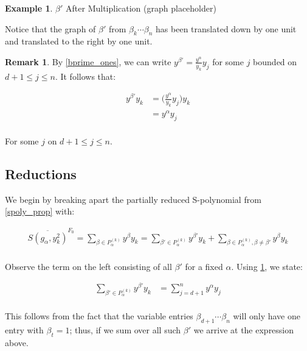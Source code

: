 \documentclass[12pt,reqno]{amsart}
\theoremstyle{plain}
\theoremstyle{definition}
\newtheorem{example}[theorem]{Example}
\newtheorem{remark}[theorem]{Remark}
\begin{document}
\begin{example} \label{bprime_after}
    $\beta'$ After Multiplication (graph placeholder)
\end{example}
Notice that the graph of $\beta'$ from $\beta_k \cdots \beta_{n}$ has been translated down by one unit and translated to the right by one unit. 


\begin{remark} \label{bprime_equiv}
    By \ref{bprime_ones}, we can write $y^{\beta'} = \frac{y^\alpha}{y_k}y_j$ for some $j$ bounded on $d+1 \leq j \leq n$. It follows that:
    
    \begin{align*}
        y^{\beta'}y_k &= \Big(\frac{y^\alpha}{y_k}y_j\Big)y_k \\ 
        &= y^\alpha y_j \\
    \end{align*}
    
For some $j$ on $d+1 \leq j \leq n$.
\end{remark}








\subsection*{Reductions}

We begin by breaking apart the partially reduced S-polynomial from \ref{spoly_prop} with:

\begin{align*}
    \overline{S(g_\alpha, y_k^2)}^{F_0} = \sum_{\beta \in P_\alpha^{(k)}}y^\beta y_k  = \sum_{\beta ' \in P_\alpha^{(k)}} y^{\beta'} y_k + \sum_{\beta \in P_\alpha^{(k)}, \beta \ne \beta '} y^\beta y_k \\
\end{align*}

Observe the term on the left consisting of all $\beta'$ for a fixed $\alpha$. Using \ref{bprime_equiv}, we state:

\begin{align*}
    \sum_{\beta ' \in P_\alpha^{(k)}} y^{\beta'} y_k &= \sum_{j=d+1}^n y^\alpha y_j \\
\end{align*}

This follows from the fact that the variable entries $\beta_{d+1} \cdots \beta_n$ will only have one entry with $\beta_t = 1$; thus, if we sum over all such $\beta'$ we arrive at the expression above. 
\end{document}
